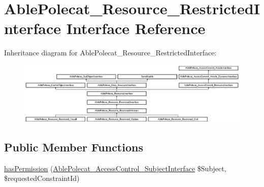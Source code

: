 \hypertarget{interface_able_polecat___resource___restricted_interface}{}\section{Able\+Polecat\+\_\+\+Resource\+\_\+\+Restricted\+Interface Interface Reference}
\label{interface_able_polecat___resource___restricted_interface}
Inheritance diagram for Able\+Polecat\+\_\+\+Resource\+\_\+\+Restricted\+Interface\+:\begin{figure}[H]
\begin{center}
\leavevmode
\includegraphics[height=2.987805cm]{interface_able_polecat___resource___restricted_interface}
\end{center}
\end{figure}
\subsection*{Public Member Functions}
\begin{DoxyCompactItemize}
\item 
\hyperlink{interface_able_polecat___resource___restricted_interface_a645291218d5ad4046d1367bb9718867f}{has\+Permission} (\hyperlink{interface_able_polecat___access_control___subject_interface}{Able\+Polecat\+\_\+\+Access\+Control\+\_\+\+Subject\+Interface} \$Subject, \$requested\+Constraint\+Id)
\end{DoxyCompactItemize}
